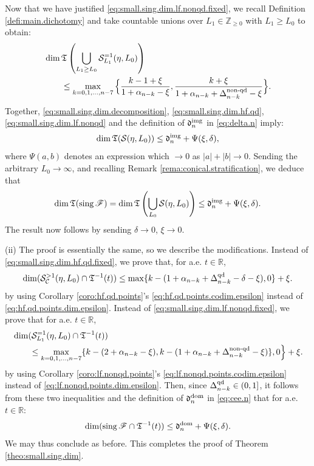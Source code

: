 \documentclass[11pt, letterpaper, reqno]{amsart}
\numberwithin{equation}{section}
\theoremstyle{remark}
\newcommand{\RR}{\mathbb{R}}
\newcommand{\ZZ}{\mathbb{Z}}
\newcommand{\cC}{\mathcal{C}}
\newcommand{\cS}{\mathcal{S}}
\newcommand{\frT}{\mathfrak{T}}
\newcommand{\sing}{\operatorname{sing}}
\begin{document}
Now that we have justified \eqref{eq:small.sing.dim.lf.nonqd.fixed}, we recall Definition \ref{defi:main.dichotomy} and take countable unions over $L_1 \in \ZZ_{\geq 0}$ with $L_1 \geq L_0$ to obtain:
\begin{align} \label{eq:small.sing.dim.lf.nonqd}
		& \dim \frT \left( \bigcup_{L_1 \geq L_0} \cS^{=1}_{L_1}(\eta, L_0) \right) \nonumber \\
		& \qquad \leq \max_{k=0,1,\ldots,n-7} \Big\{ \frac{k - 1 + \xi}{1 + \alpha_{n-k} - \xi}, \frac{k + \xi}{1 + \alpha_{n-k} + \Delta_{n-k}^{\textnormal{non-qd}} - \xi} \Big\}.
\end{align}
Together, \eqref{eq:small.sing.dim.decomposition}, \eqref{eq:small.sing.dim.hf.qd}, \eqref{eq:small.sing.dim.lf.nonqd} and the definition of ${ \mathfrak{d}_{n}^{\textnormal{img}}}$ in \eqref{eq:delta.n} imply:
\[
	\dim \frT(\cS(\eta, L_0)) \leq { \mathfrak{d}_{n}^{\textnormal{img}}} + \Psi(\xi, \delta),
\]
where $\Psi(a, b)$ denotes an expression which $\to 0$ as $|a| + |b| \to 0$. Sending the arbitrary $L_0 \to \infty$, and recalling Remark \ref{rema:conical.stratification}, we deduce that
\[ \dim \frT(\sing \mathscr{F}) = \dim \frT \left( \bigcup_{L_0} \cS(\eta, L_0) \right) \leq {\mathfrak{d}_{n}^{\textnormal{img}}} + \Psi(\xi, \delta). \]
The result now follows by sending $\delta \to 0$, $\xi \to 0$.


(ii) The proof is essentially the same, so we describe the modifications. Instead of \eqref{eq:small.sing.dim.hf.qd.fixed}, we prove that, for a.e. $t \in \RR$,
\[
	\dim (\cS^{>1}_\cC(\eta, L_0) \cap \frT^{-1}(t)) \leq \max \{ k - (1 + \alpha_{n-k} + \Delta^{\textnormal{qd}}_{n-k} - \delta - \xi), 0 \} + \xi.
\]
by using Corollary \ref{coro:hf.qd.points}'s \eqref{eq:hf.qd.points.codim.epsilon} instead of \eqref{eq:hf.qd.points.dim.epsilon}. Instead of \eqref{eq:small.sing.dim.lf.nonqd.fixed}, we prove that for a.e. $t \in \RR$, 
\begin{align*}
		& \dim (\cS^{=1}_{L_1}(\eta, L_0) \cap \frT^{-1}(t)) \\
		& \qquad \leq \max_{k=0,1,\ldots,n-7} \{ k - (2 + \alpha_{n-k} - \xi), k - (1 + \alpha_{n-k} + \Delta_{n-k}^{\textnormal{non-qd}} - \xi) \}, 0 \Big\} + \xi.
\end{align*}
by using Corollary \ref{coro:lf.nonqd.points}'s \eqref{eq:lf.nonqd.points.codim.epsilon} instead of \eqref{eq:lf.nonqd.points.dim.epsilon}. Then, since $\Delta_{n-k}^{\textnormal{qd}} \in (0, 1]$, it follows from these two inequalities and the definition of ${\mathfrak{d}_{n}^{\textnormal{dom}}}$ in \eqref{eq:cee.n} that for a.e. $t \in \RR$:
\[
	\dim (\sing \mathscr{F} \cap \frT^{-1}(t)) \leq {\mathfrak{d}_{n}^{\textnormal{dom}}} + \Psi(\xi, \delta).
\]
We may thus conclude as before. This completes the proof of Theorem \ref{theo:small.sing.dim}.
\end{document}
